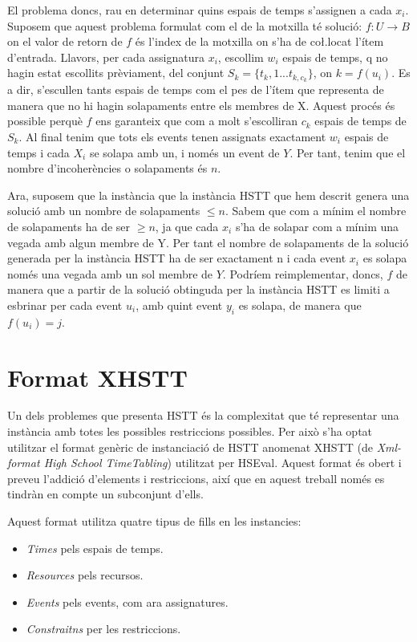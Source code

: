 \documentclass[11pt,a4paper,twoside]{report}
\begin{document}
    El problema doncs, rau en determinar quins espais de temps s'assignen a cada $x_i$. 
    Suposem que aquest problema formulat com el de la motxilla té solució: $f: U \rightarrow B$ on el valor de retorn de $f$ és l'index de la motxilla on s'ha de co\l.locat l'ítem d'entrada. 
    Llavors, per cada assignatura $x_i$, escollim $w_i$ espais de temps, q no hagin estat escollits prèviament, del conjunt $S_k = \{t_k,1 ... t_{k, c_k}\}$, on $k = f(u_i)$. 
    Es a dir, s'escullen tants espais de temps com el pes de l'ítem que representa de manera que no hi hagin solapaments entre els membres de X. Aquest procés és possible perquè $f$ ens garanteix que com a molt s'escolliran $c_k$ espais de temps de $S_k$. 
    Al final tenim que tots els events tenen assignats exactament $w_i$ espais de temps i cada $X_i$ se solapa amb un, i només un event de $Y$. Per tant, tenim que el nombre d'incoherències o solapaments és $n$.
    
    Ara, suposem que la instància que la instància HSTT que hem descrit genera una solució amb un nombre de solapaments $\leq n$. Sabem que com a mínim el nombre de solapaments ha de ser $\geq n$, ja que cada $x_i$ 
    s'ha de solapar com a mínim una vegada amb algun membre de Y. Per tant el nombre de solapaments de la solució generada per la instància HSTT ha de ser exactament n i cada event $x_i$ es solapa només una vegada amb un sol membre de $Y$.
    Podríem reimplementar, doncs, $f$ de manera que a partir de la solució obtinguda per la instància HSTT es limiti a esbrinar per cada event $u_i$, amb quint event $y_i$ es solapa, de manera que $f(u_i) =j$.

  \section{Format XHSTT}
  Un dels problemes que presenta HSTT és la complexitat que té representar una instància amb totes les possibles restriccions possibles. Per això s'ha optat utilitzar el format genèric de instanciació de HSTT anomenat XHSTT (de \textit{Xml-format High School TimeTabling}) utilitzat per HSEval\cite{xhstt}.
  Aquest format és obert i preveu l'addició d'elements i restriccions, així que en aquest treball només es tindràn en compte un subconjunt d'ells.
  
  Aquest format utilitza quatre tipus de fills en les instancies:
  \begin{itemize}
    \item \textit{Times} pels espais de temps.
    \item \textit{Resources} pels recursos.
    \item \textit{Events} pels events, com ara assignatures.
    \item \textit{Constraitns} per les restriccions.
  \end{itemize}
\end{document}

